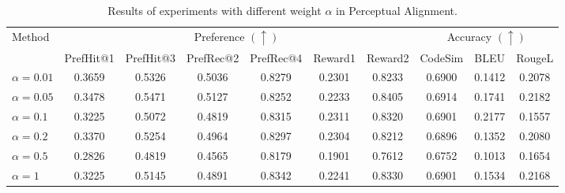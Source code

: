 \begin{table*}[t]
\centering
\caption{Results of experiments with different weight \(\alpha\) in Perceptual Alignment.}
\label{alpha}
\renewcommand{\arraystretch}{1.13} %
\tabcolsep=0.15cm %
\begin{tabular}{lccccccccc}
\toprule
\multirow{2}{*}{Method} & \multicolumn{6}{c}{Preference \((\uparrow)\)} & \multicolumn{3}{c}{Accuracy \((\uparrow)\)} \\ 
\cmidrule(lr){2-7} \cmidrule(lr){8-10}
& \small{PrefHit@1} & \small{PrefHit@3} & \small{PrefRec@2} & \small{PrefRec@4} & \small{Reward1} & \small{Reward2} 
& \small{CodeSim} & \small{BLEU} & \small{RougeL} \\ 
\midrule
\( \alpha=0.01 \) & 0.3659 & 0.5326 & 0.5036 & 0.8279 & 0.2301 & 0.8233 & 0.6900 & 0.1412 & 0.2078 \\
\(\alpha=0.05\)  & 0.3478 & 0.5471 & 0.5127 & 0.8252 & 0.2233 & 0.8405 & 0.6914 & 0.1741 & 0.2182 \\
\(\alpha=0.1\)   & 0.3225 & 0.5072 & 0.4819 & 0.8315 & 0.2311 & 0.8320 & 0.6901 & 0.2177 & 0.1557 \\  
\( \alpha=0.2 \) & 0.3370 & 0.5254 & 0.4964 & 0.8297 & 0.2304 & 0.8212 & 0.6896 & 0.1352 & 0.2080 \\
\( \alpha=0.5 \)  & 0.2826 & 0.4819 & 0.4565 & 0.8179 & 0.1901 & 0.7612 & 0.6752 & 0.1013 & 0.1654 \\
\( \alpha=1 \)   & 0.3225 & 0.5145 & 0.4891 & 0.8342 & 0.2241 & 0.8330 & 0.6901 & 0.1534 & 0.2168 \\
\bottomrule
\end{tabular}
\label{table::w}
\end{table*}




